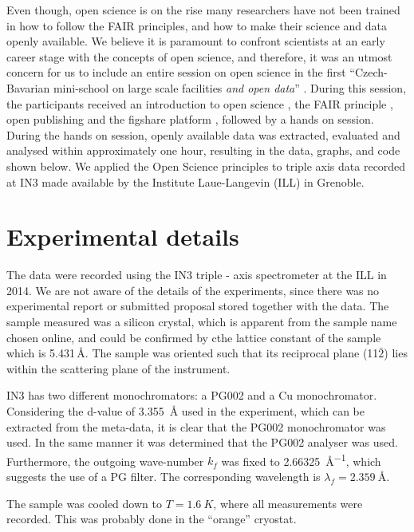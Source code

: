 \documentclass[aps,pra,reprint,amsmath,amssymb,superscriptaddress,showkeys]{revtex4-1}
\begin{document}
Even though, open science is on the rise many researchers have not been trained in how to follow the FAIR principles, and how to make their science and data openly available.
We believe it is paramount to confront scientists at an early career stage with the concepts of open science, and therefore, it was an utmost concern for us to include an entire session on open science in the first ``Czech-Bavarian mini-school on large scale facilities \emph{and open data}'' \cite{mini-school}.
During this session, the participants received an introduction to open science \cite{foster}, the FAIR principle \cite{FAIR}, open publishing \cite{arXiv} and the figshare platform \cite{figshare}, followed by a hands on session.
During the hands on session, openly available data was extracted, evaluated and analysed within approximately one hour, resulting in the data, graphs, and code \cite{data-evaluation, data-docker} shown below.
We applied the Open Science principles to triple axis data recorded at IN3 \cite{data} made available by the Institute Laue-Langevin (ILL) in Grenoble.

\section{Experimental details}

The data were recorded using the IN3 triple - axis spectrometer \cite{IN3} at the ILL in 2014.
We are not aware of the details of the experiments, since there was no experimental report or submitted proposal stored together with the data.
The sample measured was a silicon crystal, which is apparent from the sample name chosen online, and could be confirmed by cthe lattice constant of the sample which is 5.431\,\AA \cite{Hom1975}. The sample was oriented such that its reciprocal plane (11$\bar{2}$) lies within the scattering plane of the instrument.


IN3 has two different monochromators: a PG002 and a Cu monochromator.
Considering the d-value of \SI{3.355}{\mbox{\AA}} used in the experiment, which can be extracted from the meta-data, it is clear that the PG002 monochromator was used.
In the same manner it was determined that the PG002 analyser was used. 
Furthermore, the outgoing wave-number $k_f$ was fixed to \SI{2.66325}{\mbox{\AA}^{-1}}, which suggests the use of a PG filter. 
The corresponding wavelength is $\lambda_f=\SI{2.359}{\mbox{\AA}}$.

The sample was cooled down to $T = \SI{1.6}{K}$, where all measurements were recorded. 
This was probably done in the ``orange'' cryostat.
\end{document}
